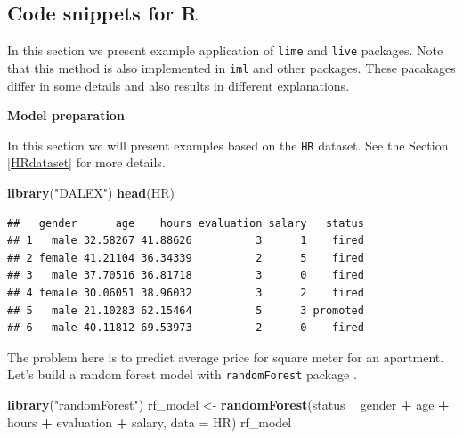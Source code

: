 \documentclass[]{krantz}
\newenvironment{Shaded}{\begin{snugshade}}{\end{snugshade}}
\newcommand{\DataTypeTok}[1]{\textcolor[rgb]{0.13,0.29,0.53}{#1}}
\newcommand{\KeywordTok}[1]{\textcolor[rgb]{0.13,0.29,0.53}{\textbf{#1}}}
\newcommand{\NormalTok}[1]{#1}
\newcommand{\OperatorTok}[1]{\textcolor[rgb]{0.81,0.36,0.00}{\textbf{#1}}}
\newcommand{\StringTok}[1]{\textcolor[rgb]{0.31,0.60,0.02}{#1}}
\theoremstyle{definition}
\theoremstyle{definition}
\theoremstyle{definition}
\theoremstyle{remark}
\begin{document}
\hypertarget{code-snippets-for-r-3}{%
\subsection{Code snippets for R}\label{code-snippets-for-r-3}}

In this section we present example application of \texttt{lime}
\citep{R-lime} and \texttt{live} \citep{R-live} packages. Note that this
method is also implemented in \texttt{iml} \citep{R-iml} and other
packages. These pacakages differ in some details and also results in
different explanations.

\textbf{Model preparation}

In this section we will present examples based on the \texttt{HR}
dataset. See the Section \ref{HRdataset} for more details.

\begin{Shaded}
\begin{Highlighting}[]
\KeywordTok{library}\NormalTok{(}\StringTok{"DALEX"}\NormalTok{)}
\KeywordTok{head}\NormalTok{(HR)}
\end{Highlighting}
\end{Shaded}

\begin{verbatim}
##   gender      age    hours evaluation salary   status
## 1   male 32.58267 41.88626          3      1    fired
## 2 female 41.21104 36.34339          2      5    fired
## 3   male 37.70516 36.81718          3      0    fired
## 4 female 30.06051 38.96032          3      2    fired
## 5   male 21.10283 62.15464          5      3 promoted
## 6   male 40.11812 69.53973          2      0    fired
\end{verbatim}

The problem here is to predict average price for square meter for an
apartment. Let's build a random forest model with \texttt{randomForest}
package \citep{R-randomForest}.

\begin{Shaded}
\begin{Highlighting}[]
\KeywordTok{library}\NormalTok{(}\StringTok{"randomForest"}\NormalTok{)}
\NormalTok{rf_model <-}\StringTok{ }\KeywordTok{randomForest}\NormalTok{(status }\OperatorTok{~}\StringTok{ }\NormalTok{gender }\OperatorTok{+}\StringTok{ }\NormalTok{age }\OperatorTok{+}\StringTok{ }\NormalTok{hours }\OperatorTok{+}\StringTok{ }\NormalTok{evaluation }\OperatorTok{+}\StringTok{ }\NormalTok{salary, }\DataTypeTok{data =}\NormalTok{ HR)}
\NormalTok{rf_model}
\end{Highlighting}
\end{Shaded}
\end{document}
